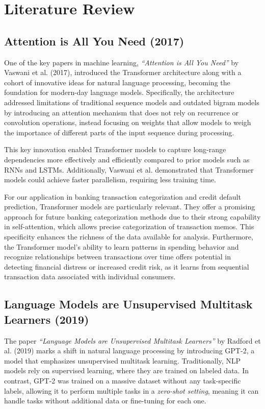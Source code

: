 \documentclass[12pt,letterpaper]{article}
\begin{document}
\section{Literature Review}

\subsection{Attention is All You Need (2017)}

One of the key papers in machine learning, \textit{“Attention is All You Need”} by Vaswani et al. (2017), introduced the Transformer architecture along with a cohort of innovative ideas for natural language processing, becoming the foundation for modern-day language models. Specifically, the architecture addressed limitations of traditional sequence models and outdated bigram models by introducing an attention mechanism that does not rely on recurrence or convolution operations, instead focusing on weights that allow models to weigh the importance of different parts of the input sequence during processing.

This key innovation enabled Transformer models to capture long-range dependencies more effectively and efficiently compared to prior models such as RNNs and LSTMs. Additionally, Vaswani et al. demonstrated that Transformer models could achieve faster parallelism, requiring less training time.

For our application in banking transaction categorization and credit default prediction, Transformer models are particularly relevant. They offer a promising approach for future banking categorization methods due to their strong capability in self-attention, which allows precise categorization of transaction memos. This specificity enhances the richness of the data available for analysis. Furthermore, the Transformer model's ability to learn patterns in spending behavior and recognize relationships between transactions over time offers potential in detecting financial distress or increased credit risk, as it learns from sequential transaction data associated with individual consumers.

\subsection{Language Models are Unsupervised Multitask Learners (2019)}
The paper \textit{“Language Models are Unsupervised Multitask Learners”} by Radford et al. (2019) marks a shift in natural language processing by introducing GPT-2, a model that emphasizes unsupervised multitask learning. Traditionally, NLP models rely on supervised learning, where they are trained on labeled data. In contrast, GPT-2 was trained on a massive dataset without any task-specific labels, allowing it to perform multiple tasks in a \textit{zero-shot setting}, meaning it can handle tasks without additional data or fine-tuning for each one.
\end{document}
